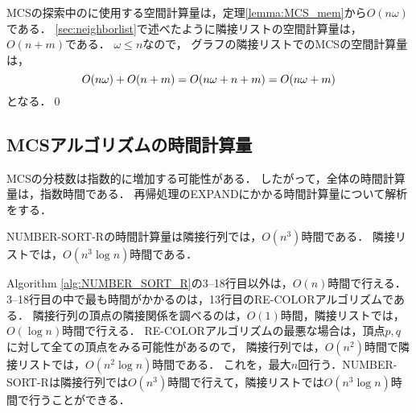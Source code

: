 \begin{Proof*}{}
    MCSの探索中のに使用する空間計算量は，定理\ref{lemma:MCS_mem}から$O(n \omega)$である．
    \ref{sec:neighborlist}で述べたように隣接リストの空間計算量は，$O(n + m )$である．
    $\omega \leq n $なので，
    グラフの隣接リストでのMCSの空間計算量は，
    \begin{equation}
    O( n\omega ) + O( n + m  ) = O( n\omega + n + m ) = O(n\omega + m )
    \notag
    \end{equation}
    となる．\qed
\end{Proof*}

\subsection{MCSアルゴリズムの時間計算量}
MCSの分枝数は指数的に増加する可能性がある．
したがって，全体の時間計算量は，指数時間である．
再帰処理のEXPANDにかかる時間計算量について解析をする．
\begin{lemma}
    NUMBER-SORT-Rの時間計算量は隣接行列では，$O(n^3)$時間である．
    隣接リストでは，$O(n^3 \log n )$時間である．
\end{lemma}
\begin{Proof*}{}
    Algorithm \ref{alg:NUMBER_SORT_R}の3--18行目以外は，$O(n)$時間で行える．
    3--18行目の中で最も時間がかかるのは，13行目のRE-COLORアルゴリズムである．
    隣接行列の頂点の隣接関係を調べるのは，$O(1)$時間，隣接リストでは，$O( \log n )$時間で行える．
    RE-COLORアルゴリズムの最悪な場合は，頂点$p,q$に対して全ての頂点をみる可能性があるので，
    隣接行列では，$O(n^2)$時間で隣接リストでは，$O(n^2 \log n )時間$である．
    これを，最大$n$回行う．NUMBER-SORT-Rは隣接行列では$O(n^3)$時間で行えて，隣接リストでは$O(n^3 \log n )$時間で行うことができる．
\end{Proof*}

